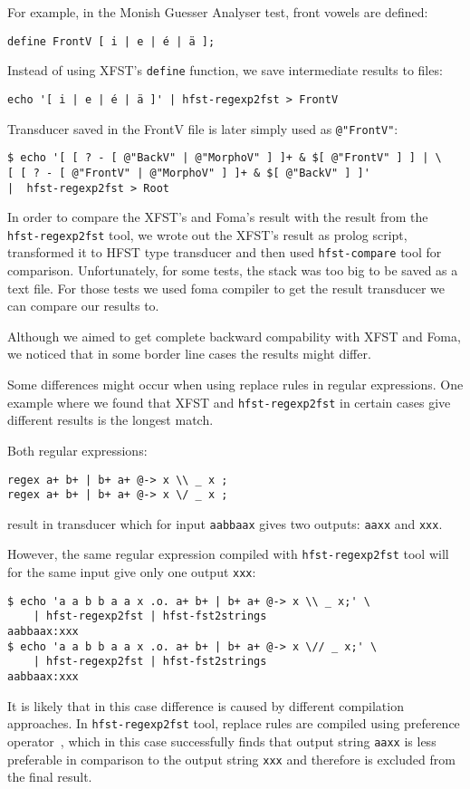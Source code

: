 \documentclass{llncs}
\begin{document}
For example, in the Monish Guesser Analyser test, front vowels are defined:
\begin{verbatim}
define FrontV [ i | e | é | ä ];
\end{verbatim}  
Instead of using XFST's \verb+define+ function, we save intermediate results
to files:
\begin{verbatim}
echo '[ i | e | é | ä ]' | hfst-regexp2fst > FrontV
\end{verbatim}  
Transducer saved in the FrontV file is later simply used as \verb+@"FrontV"+:
\begin{verbatim}
$ echo '[ [ ? - [ @"BackV" | @"MorphoV" ] ]+ & $[ @"FrontV" ] ] | \
[ [ ? - [ @"FrontV" | @"MorphoV" ] ]+ & $[ @"BackV" ] ]'
|  hfst-regexp2fst > Root
\end{verbatim}

In order to compare the XFST's and Foma's result with the result from the
\verb+hfst-regexp2fst+ tool, we wrote out the XFST's result as prolog script,
transformed it to HFST type transducer and then used \verb+hfst-compare+ tool
for comparison. Unfortunately, for some tests, the stack was too big to be saved
as a text file. For those tests we used foma compiler to get the result
transducer we can compare our results to.

Although we aimed to get complete backward compability with XFST and Foma, we
noticed that in some border line cases the results might differ.

Some differences might occur when using replace rules in regular expressions.
One example where we found that XFST and \verb+hfst-regexp2fst+ in certain cases
give different results is the longest match.

Both regular expressions: 
\begin{verbatim}
regex a+ b+ | b+ a+ @-> x \\ _ x ;
regex a+ b+ | b+ a+ @-> x \/ _ x ;
\end{verbatim}
result in transducer which for input \verb+aabbaax+ gives two outputs:
\verb+aaxx+ and \verb+xxx+.

However, the same regular expression compiled with \verb+hfst-regexp2fst+ tool
will for the same input give only one output \verb+xxx+:
\begin{verbatim}
$ echo 'a a b b a a x .o. a+ b+ | b+ a+ @-> x \\ _ x;' \
    | hfst-regexp2fst | hfst-fst2strings
aabbaax:xxx
$ echo 'a a b b a a x .o. a+ b+ | b+ a+ @-> x \// _ x;' \
    | hfst-regexp2fst | hfst-fst2strings
aabbaax:xxx
\end{verbatim} 
It is likely that in this case difference is caused by different compilation approaches.
In \verb+hfst-regexp2fst+ tool, replace rules are compiled using preference
operator~\cite{drobac/2012}, which in this case successfully finds that output string
\verb+aaxx+ is less preferable in comparison to the output string \verb+xxx+ and therefore is excluded from the final result.
\end{document}
